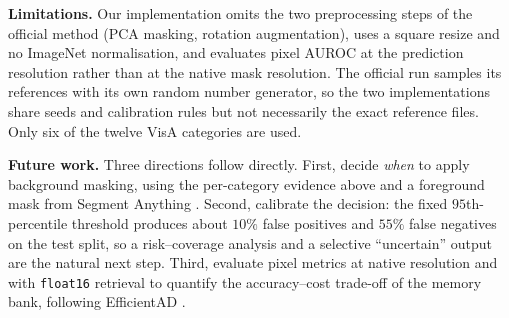 \documentclass[10pt,twocolumn,letterpaper]{article}
\begin{document}
\textbf{Limitations.} Our implementation omits the two preprocessing steps of
the official method (PCA masking, rotation augmentation), uses a square resize
and no ImageNet normalisation, and evaluates pixel AUROC at the prediction
resolution rather than at the native mask resolution. The official run samples
its references with its own random number generator, so the two implementations
share seeds and calibration rules but not necessarily the exact reference files.
Only six of the twelve VisA categories are used.

\textbf{Future work.} Three directions follow directly. First, decide
\emph{when} to apply background masking, using the per-category evidence above
and a foreground mask from Segment Anything \cite{kirillov2023sam}. Second,
calibrate the decision: the fixed $95$th-percentile threshold produces about
$10\%$ false positives and $55\%$ false negatives on the test split, so a
risk--coverage analysis and a selective ``uncertain'' output are the natural
next step. Third, evaluate pixel metrics at native resolution and with
\texttt{float16} retrieval to quantify the accuracy--cost trade-off of the
memory bank, following EfficientAD \cite{batzner2024efficientad}.

{\small


}
\end{document}
